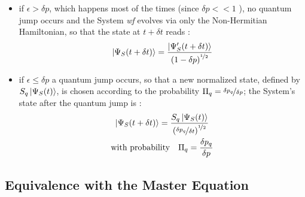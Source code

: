 \documentclass[a4paper,12pt]{article}
\begin{document}
	\begin{itemize}
		\item if $ \epsilon > \delta p $, which happens most of the times (since $ \delta p << 1 $ ), no quantum jump occurs and the System \textit{wf} evolves via only the Non-Hermitian Hamiltonian, so that the state at $ t + \delta t $ reads : 
		\begin{equation}
			\ket{\Psi_{S} (t +\delta t)} = \frac{\ket{\Psi_{S}' (t +\delta t)}}{\left(1 - \delta p\right)^{\nicefrac{1}{2}}} \label{eq:no_qj_evo}
		\end{equation}
		\item if $ \epsilon \leq \delta p $ a quantum jump occurs, so that a new normalized state, defined by $ S_{q} \ket{\Psi_{S}(t)} $, is chosen according to the probability $ \Pi_{q} = \nicefrac{\delta p_{q}}{\delta p} $; \newline
		the System's state after the quantum jump is :
		\begin{gather}
			\ket{\Psi_{S} (t +\delta t)} = \frac{S_{q} \ket{\Psi_{S}(t)}}{\left(\nicefrac{\delta p_{q}}{\delta t}\right)^{\nicefrac{1}{2}}} \label{eq:qj_evo} \\
			\text{with probability} \quad \Pi_{q} = \frac{\delta p_{q}}{\delta p} 
		\end{gather}
	\end{itemize}
	
	\newpage
	\subsection{Equivalence with the Master Equation}
	\label{sub:Equivalence_with_the_Master_Equation}
	 
\end{document}
